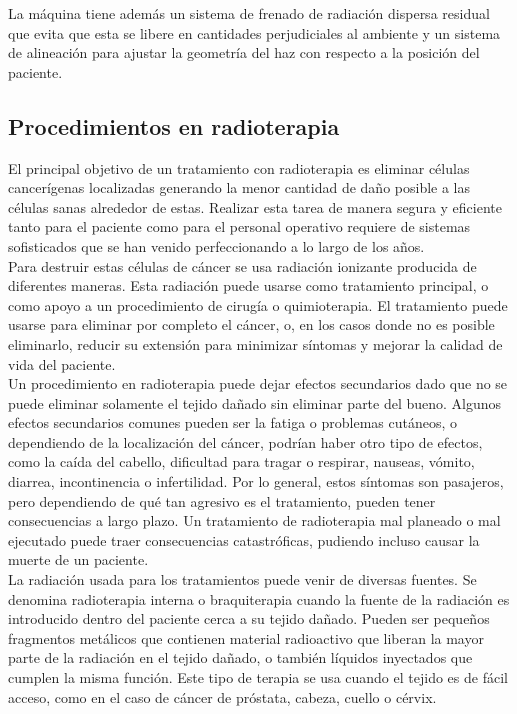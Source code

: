 La máquina tiene además un sistema de frenado de radiación dispersa residual que evita que esta se libere en cantidades perjudiciales al ambiente y un sistema de alineación para ajustar la geometría del haz con respecto a la posición del paciente.\\



\subsection{Procedimientos en radioterapia}

El principal objetivo de un tratamiento con radioterapia es eliminar células cancerígenas localizadas generando la menor cantidad de daño posible a las células sanas alrededor de estas. Realizar esta tarea de manera segura y eficiente tanto para el paciente como para el personal operativo requiere de sistemas sofisticados que se han venido perfeccionando a lo largo de los años\cite{radioterapia}\cite{cancer.net_2020}.\\

Para destruir estas células de cáncer se usa radiación ionizante producida de diferentes maneras. Esta radiación puede usarse como tratamiento principal, o como apoyo a un procedimiento de cirugía o quimioterapia. El tratamiento puede usarse para eliminar por completo el cáncer, o, en los casos donde no es posible eliminarlo, reducir su extensión para minimizar síntomas y mejorar la calidad de vida del paciente.\\

Un procedimiento en radioterapia puede dejar efectos secundarios dado que no se puede eliminar solamente el tejido dañado sin eliminar parte del bueno. Algunos efectos secundarios comunes pueden ser la fatiga o problemas cutáneos, o dependiendo de la localización del cáncer, podrían haber otro tipo de efectos, como la caída del cabello, dificultad para tragar o respirar, nauseas, vómito, diarrea, incontinencia o infertilidad. Por lo general, estos síntomas son pasajeros, pero dependiendo de qué tan agresivo es el tratamiento, pueden tener consecuencias a largo plazo. Un tratamiento de radioterapia mal planeado o mal ejecutado puede traer consecuencias catastróficas, pudiendo incluso causar la muerte de un paciente.\\

La radiación usada para los tratamientos puede venir de diversas fuentes. Se denomina radioterapia interna o braquiterapia cuando la fuente de la radiación es introducido dentro del paciente cerca a su tejido dañado. Pueden ser pequeños fragmentos metálicos que contienen material radioactivo que liberan la mayor parte de la radiación en el tejido dañado, o también líquidos inyectados que cumplen la misma función. Este tipo de terapia se usa cuando el tejido es de fácil acceso, como en el caso de cáncer de próstata, cabeza, cuello o cérvix.\\

